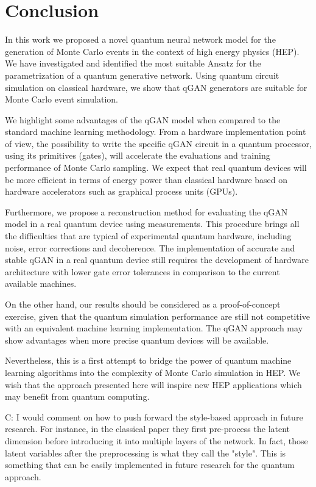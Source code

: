 \documentclass[twocolumn,preprintnumbers,superscriptaddress]{revtex4-2}
\begin{document}
\section{Conclusion}
\label{sec:conclusion}

In this work we proposed a novel quantum neural network model for the generation
of Monte Carlo events in the context of high energy physics (HEP). We have
investigated and identified the most suitable Ansatz for the parametrization of
a quantum generative network. Using quantum circuit simulation on classical
hardware, we show that qGAN generators are suitable for Monte Carlo event
simulation.

We highlight some advantages of the qGAN model when compared to the standard
machine learning methodology. From a hardware implementation point of view, the
possibility to write the specific qGAN circuit in a quantum processor, using its
primitives (gates), will accelerate the evaluations and training performance of
Monte Carlo sampling. We expect that real quantum devices will be more efficient
in terms of energy power than classical hardware based on hardware accelerators
such as graphical process units (GPUs).

Furthermore, we propose a reconstruction method for evaluating the qGAN model in
a real quantum device using measurements. This procedure brings all the
difficulties that are typical of experimental quantum hardware, including noise,
error corrections and decoherence. The implementation of accurate and stable
qGAN in a real quantum device still requires the development of hardware
architecture with lower gate error tolerances in comparison to the current
available machines.

On the other hand, our results should be considered as a proof-of-concept
exercise, given that the quantum simulation performance are still not
competitive with an equivalent machine learning implementation. The qGAN
approach may show advantages when more precise quantum devices will be
available.

Nevertheless, this is a first attempt to bridge the power of quantum machine
learning algorithms into the complexity of Monte Carlo simulation in HEP. We
wish that the approach presented here will inspire new HEP applications which
may benefit from quantum computing.

{\color{red} C: I would comment on how to push forward the style-based approach in future research. For instance, in the classical paper they first pre-process the latent dimension before introducing it into multiple layers of the network. In fact, those latent variables after the preprocessing is what they call the "style". This is something that can be easily implemented in future research for the quantum approach.}
\end{document}

